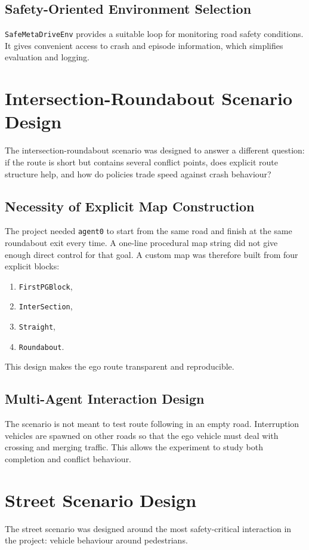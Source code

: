 \documentclass[12pt,a4paper]{report}
\begin{document}
\subsection{Safety-Oriented Environment Selection}
\texttt{SafeMetaDriveEnv} provides a suitable loop for monitoring road safety conditions. It gives convenient access to crash and episode information, which simplifies evaluation and logging.

\section{Intersection-Roundabout Scenario Design}
The intersection-roundabout scenario was designed to answer a different question: if the route is short but contains several conflict points, does explicit route structure help, and how do policies trade speed against crash behaviour?

\subsection{Necessity of Explicit Map Construction}
The project needed \texttt{agent0} to start from the same road and finish at the same roundabout exit every time. A one-line procedural map string did not give enough direct control for that goal. A custom map was therefore built from four explicit blocks:

\begin{enumerate}[label=\arabic*.]
    \item \texttt{FirstPGBlock},
    \item \texttt{InterSection},
    \item \texttt{Straight},
    \item \texttt{Roundabout}.
\end{enumerate}

This design makes the ego route transparent and reproducible.

\subsection{Multi-Agent Interaction Design}
The scenario is not meant to test route following in an empty road. Interruption vehicles are spawned on other roads so that the ego vehicle must deal with crossing and merging traffic. This allows the experiment to study both completion and conflict behaviour.

\section{Street Scenario Design}
The street scenario was designed around the most safety-critical interaction in the project: vehicle behaviour around pedestrians.
\end{document}
